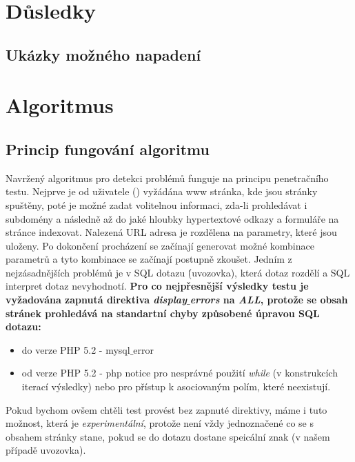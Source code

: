 \documentclass[12pt, a4paper]{report}
\begin{document}

\chapter{Důsledky}


\section{Ukázky možného napadení}

\chapter{Algoritmus}

\section{Princip fungování algoritmu}
Navržený algoritmus pro detekci problémů funguje na principu penetračního testu. Nejprve je od uživatele () vyžádána www stránka, kde jsou stránky spuštěny, poté je možné zadat volitelnou informaci, zda-li prohledávat i subdomény a následně až do jaké hloubky hypertextové odkazy a formuláře na stránce indexovat. Nalezená URL adresa je rozdělena na parametry, které jsou uloženy. Po dokončení procházení se začínají generovat možné kombinace parametrů a tyto kombinace se začínají postupně zkoušet. Jedním z nejzásadnějších problémů je v SQL dotazu \' (uvozovka), která dotaz rozdělí a SQL interpret dotaz nevyhodnotí.
 \textbf{Pro co nejpřesnější výsledky testu je vyžadována zapnutá direktiva \textit{display$\_$errors} na \textit{ALL}, protože se obsah stránek prohledává na standartní chyby způsobené úpravou SQL dotazu:}
\begin{itemize}
\item do verze PHP 5.2 - mysql$\_$error
\item od verze PHP 5.2 - php notice pro nesprávné použití \textit{while} (v konstrukcích iterací výsledky) nebo pro přístup k asociovaným polím, které neexistují.
\end{itemize}
Pokud bychom ovšem chtěli test provést bez zapnuté direktivy, máme i tuto možnost, která je \textit{experimentální}, protože není vždy jednoznačené co se s obsahem stránky stane, pokud se do dotazu dostane speicální znak (v našem případě uvozovka).
\end{document}
